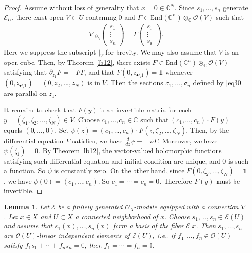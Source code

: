 \documentclass[12pt,a4paper,notitlepage]{report}
\theoremstyle{definition}
\theoremstyle{plain}
\newtheorem{lm}[df]{Lemma}
\newcommand{\End}{\mathrm{End}} %
\newcommand{\id}{\mathbf{1}}
\newcommand{\scr}{\mathscr}
\newcommand{\mbb}{\mathbb}
\newcommand{\blt}{\bullet}
\newcommand{\Cbb}{\mathbb C}
\numberwithin{equation}{section}
\begin{document}
\begin{proof}
Assume without loss of generality that $x=0\in\mbb C^N$. Since $s_1,\dots,s_n$ generate $\scr E_U$, there exist open $V\subset U$ containing $0$ and $\Gamma\in\End(\Cbb^n)\otimes_\Cbb\scr O(V)$ such that
\begin{align*}
\nabla_{\partial_{z_1}}
\left( \begin{array}{c}
s_1 \\
\vdots \\
s_n
\end{array} \right)
=\Gamma\left( \begin{array}{c}
s_1 \\
\vdots \\
s_n
\end{array} \right).
\end{align*}
Here we suppress the subscript $|_V$ for brevity. We may also assume that $V$ is an open cube. Then, by Theorem \ref{lb12}, there exists $F\in\End(\Cbb^n)\otimes_\Cbb\scr O(V)$ satisfying that $\partial_{z_1}F=-F\Gamma$, and that $F(0,z_{\blt\setminus 1})=\id$ whenever $(0,z_{\blt\setminus 1})=(0,z_2,\dots,z_N)$ is in $V$. Then the sections $\sigma_1,\dots,\sigma_n$ defined by \eqref{eq30} are parallel on $z_1$. 

It remains to check that $F(y)$ is an invertible matrix for each $y=(\zeta_1,\zeta_2,\dots,\zeta_N)\in V$. Choose $c_1,\dots,c_n\in\mbb C$ such that $(c_1,\dots,c_n)\cdot F(y)$ equals $(0,\dots,0)$. Set $\psi(z)=(c_1,\dots,c_n)\cdot F(z,\zeta_2,\dots,\zeta_N)$. Then, by  the differential equation $F$ satisfies, we have $\frac d{dz}\psi=-\psi\Gamma$. Moreover, we have $\psi(\zeta_1)=0$. By Theorem \ref{lb12}, the vector-valued holomorphic functions satisfying such differential equation and initial condition are unique, and $0$ is such a function. So $\psi$ is constantly zero. On the other hand, since $F(0,\zeta_2,\dots,\zeta_N)=\id$, we  have $\psi(0)=(c_1,\dots,c_n)$. So $c_1=\cdots=c_n=0$. Therefore $F(y)$ must be invertible. 
\end{proof}






\begin{lm}\label{lb61}
Let $\scr E$ be a finitely generated $\scr O_X$-module equipped with a connection $\nabla$. Let $x\in X$ and $U\subset X$ a connected neighborhood of $x$.  Choose $s_1,\dots,s_n\in\scr E(U)$ and assume that $s_1(x),\dots,s_n(x)$ form a basis of the fiber $\scr E|x$. Then $s_1,\dots,s_n$ are $\scr O(U)$-linear independent elements of $\scr E(U)$, i.e., if $f_1,\dots,f_n\in\scr O(U)$ satisfy $f_1s_1+\cdots+f_ns_n=0$, then $f_1=\cdots=f_n=0$.
\end{lm}
\end{document}
